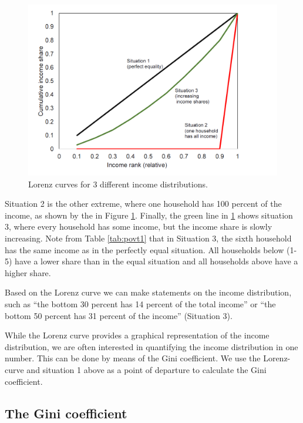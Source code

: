 \documentclass[]{book}
\begin{document}
\begin{figure}

{\centering \includegraphics[width=0.75\linewidth]{_resources/chapter_inequality/ex6_1} 

}

\caption{Lorenz curves for 3 different income distributions.}\label{fig:poverty0}
\end{figure}

Situation 2 is the other extreme, where one household has 100 percent of the income, as shown by the in Figure \ref{fig:poverty0}. Finally, the green line in \ref{fig:poverty0} shows situation 3, where every household has some income, but the income share is slowly increasing. Note from Table \ref{tab:povt1} that in Situation 3, the sixth household has the same income as in the perfectly equal situation. All households below (1-5) have a lower share than in the equal situation and all households above have a higher share.

Based on the Lorenz curve we can make statements on the income distribution, such as ``the bottom 30 percent has 14 percent of the total income'' or ``the bottom 50 percent has 31 percent of the income'' (Situation 3).

While the Lorenz curve provides a graphical representation of the income distribution, we are often interested in quantifying the income distribution in one number. This can be done by means of the Gini coefficient. We use the Lorenz-curve and situation 1 above as a point of departure to calculate the Gini coefficient.

\hypertarget{the-gini-coefficient}{%
\subsection{The Gini coefficient}\label{the-gini-coefficient}}
\end{document}
